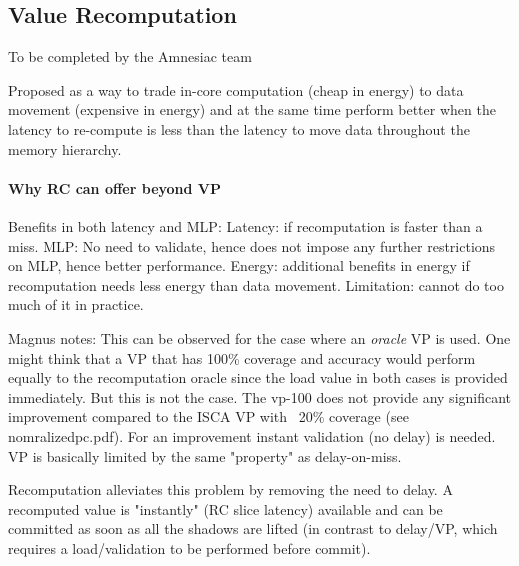 \subsection{Value Recomputation}
\label{sec:recmp}

{\color{red} To be completed by the Amnesiac team}

{\color{blue} Proposed as a way to trade in-core computation (cheap in energy) to data movement (expensive in energy) and at the same time perform better when the latency to re-compute is less than the latency to move data throughout the memory hierarchy.
\paragraph{Why RC can offer beyond VP}
Benefits in both latency and MLP: Latency: if recomputation is faster than a miss. MLP: No need to validate, hence does not impose any further restrictions on MLP, hence better performance. Energy: additional benefits in energy if recomputation needs less energy than data movement. Limitation: cannot do too much of it in practice. }

{\color{red} Magnus notes:
This can be observed for the case where an \emph{oracle} VP is used. One might think that a VP that has 100\% coverage and accuracy would perform equally to the recomputation oracle since the load value in both cases is provided immediately. But this is not the case. The vp-100 does not provide any significant improvement compared to the ISCA VP with ~20\% coverage (see nomralizedpc.pdf). For an improvement instant validation (no delay) is needed. VP is basically limited by the same "property" as delay-on-miss.

Recomputation alleviates this problem by removing the need to delay. A recomputed value is "instantly" (RC slice latency) available and can be committed as soon as all the shadows are lifted (in contrast to delay/VP, which requires a load/validation to be performed before commit).
}



 